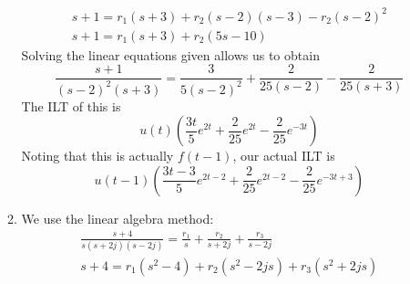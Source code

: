 \documentclass[12pt]{article}
\begin{document}
\begin{enumerate}
\begin{enumerate}
\begin{gather*}
                              s+1=r_1(s+3)+r_2(s-2)(s-3)-r_2(s-2)^2 \\
                              s+1=r_1(s+3)+r_2(5s-10)
                        \end{gather*}
                        Solving the linear equations given allows us to obtain
                        \[\frac{s+1}{(s-2)^2(s+3)}=\frac{3}{5(s-2)^2}+\frac{2}{25(s-2)}-\frac{2}{25(s+3)}\]
                        The ILT of this is
                        \[u(t)\left(\frac{3t}{5}e^{2t}+\frac{2}{25}e^{2t}-\frac{2}{25}e^{-3t}\right)\]
                        Noting that this is actually $f(t-1)$, our actual ILT is
                        \[\boxed{u(t-1)\left(\frac{3t-3}{5}e^{2t-2}+\frac{2}{25}e^{2t-2}-\frac{2}{25}e^{-3t+3}\right)}\]

                  \item We use the linear algebra method:
                        \begin{gather*}
                              \frac{s+4}{s(s+2j)(s-2j)}=\frac{r_1}{s}+\frac{r_2}{s+2j}+\frac{r_3}{s-2j} \\
                              s+4=r_1(s^2-4)+r_2(s^2-2js)+r_3(s^2+2js)
                        \end{gather*}


\end{enumerate}
\end{enumerate}
\end{document}
